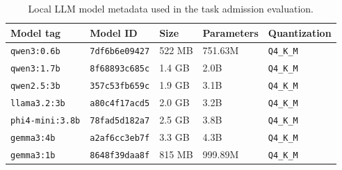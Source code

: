 \begin{table}[htbp]
\centering
\caption{Local LLM model metadata used in the task admission evaluation.}
\label{tab:local_llm_metadata}
\begin{tabular}{lllll}
\toprule
Model tag & Model ID & Size & Parameters & Quantization \\
\midrule
\texttt{qwen3:0.6b} & \texttt{7df6b6e09427} & 522 MB & 751.63M & \texttt{Q4\_K\_M} \\
\texttt{qwen3:1.7b} & \texttt{8f68893c685c} & 1.4 GB & 2.0B & \texttt{Q4\_K\_M} \\
\texttt{qwen2.5:3b} & \texttt{357c53fb659c} & 1.9 GB & 3.1B & \texttt{Q4\_K\_M} \\
\texttt{llama3.2:3b} & \texttt{a80c4f17acd5} & 2.0 GB & 3.2B & \texttt{Q4\_K\_M} \\
\texttt{phi4-mini:3.8b} & \texttt{78fad5d182a7} & 2.5 GB & 3.8B & \texttt{Q4\_K\_M} \\
\texttt{gemma3:4b} & \texttt{a2af6cc3eb7f} & 3.3 GB & 4.3B & \texttt{Q4\_K\_M} \\
\texttt{gemma3:1b} & \texttt{8648f39daa8f} & 815 MB & 999.89M & \texttt{Q4\_K\_M} \\
\bottomrule
\end{tabular}
\end{table}